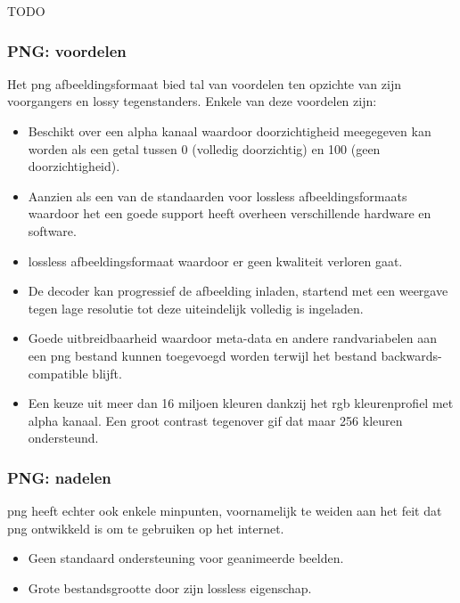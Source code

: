 TODO


\subsubsection{PNG: voordelen}
\label{sec:afbeeldingscompressie-png-voordelen}

Het \gls{png} \gls{afbeeldingsformaat} bied tal van voordelen ten opzichte van zijn voorgangers en \gls{lossy} tegenstanders. Enkele van deze voordelen zijn:

\begin{itemize}
	\item Beschikt over een alpha kanaal waardoor doorzichtigheid meegegeven kan worden als een getal tussen 0 (volledig doorzichtig) en 100 (geen doorzichtigheid).
	
	\item Aanzien als een van de standaarden voor \gls{lossless} \glspl{afbeeldingsformaat} waardoor het een goede support heeft overheen verschillende hardware en software.
	
	\item \Gls{lossless} \gls{afbeeldingsformaat} waardoor er geen kwaliteit verloren gaat.
	
	\item De  \gls{decoder} kan progressief de afbeelding inladen, startend met een weergave tegen lage resolutie tot deze uiteindelijk volledig is ingeladen.
	
	\item Goede uitbreidbaarheid waardoor \gls{meta-data} en andere randvariabelen aan een \gls{png} bestand kunnen toegevoegd worden terwijl het bestand  \gls{backwards-compatible} blijft.
	
	\item Een keuze uit meer dan 16 miljoen kleuren dankzij het \gls{rgb} kleurenprofiel met alpha kanaal. Een groot contrast tegenover \gls{gif} dat maar 256 kleuren ondersteund. 
\end{itemize}

\subsubsection{PNG: nadelen}
\label{sec:afbeeldingscompressie-png-nadelen}

\Gls{png} heeft echter ook enkele minpunten, voornamelijk te weiden aan het feit dat \gls{png} ontwikkeld is om te gebruiken op het internet.

\begin{itemize}
	\item Geen standaard ondersteuning voor geanimeerde beelden.
	
	\item Grote bestandsgrootte door zijn \gls{lossless} eigenschap.
\end{itemize}

